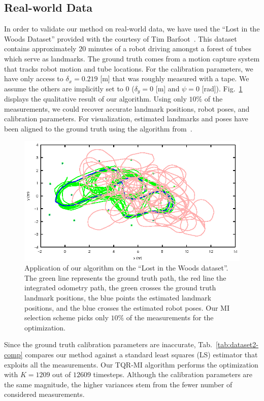 \subsection{Real-world Data}

In order to validate our method on real-world data, we have used the ``Lost in
the Woods Dataset'' provided with the courtesy of Tim
Barfoot~\cite{tong12gaussian}. This dataset contains approximately $20$ minutes
of a robot driving amongst a forest of tubes which serve as landmarks. The
ground truth comes from a motion capture system that tracks robot motion and
tube locations. For the calibration parameters, we have only access to
$\delta_x=0.219$ [m] that was roughly measured with a tape. We assume the others
are implicitly set to $0$ ($\delta_y=0$ [m] and $\psi=0$ [rad]).
Fig.~\ref{fig:dataset2-path-result} displays the qualitative result of our
algorithm. Using only $10\%$ of the measurements, we could recover accurate
landmark positions, robot poses, and calibration parameters. For visualization,
estimated landmarks and poses have
been aligned to the ground truth using the algorithm
from~\cite{fiore01efficient}.

\begin{figure}[t]
\centering
\includegraphics[]{fig/dataset2-path-result.eps}
\caption{Application of our algorithm on the ``Lost in the Woods dataset''.
  The green line represents the ground truth path, the red line the integrated
  odometry path, the green crosses the ground truth landmark positions, the blue
  points the estimated landmark positions, and the blue crosses the estimated
  robot poses. Our MI selection scheme picks only $10\%$ of the measurements
  for the optimization.}
\label{fig:dataset2-path-result}
\end{figure}

Since the ground truth calibration parameters are inaccurate,
Tab.~\ref{tab:dataset2-comp} compares our method against a standard
least squares (LS) estimator that exploits all the measurements. Our TQR-MI
algorithm performs the optimization with $K=1209$ out of $12609$ timesteps.
Although the calibration parameters are the same magnitude, the higher variances
stem from the fewer number of considered measurements.

